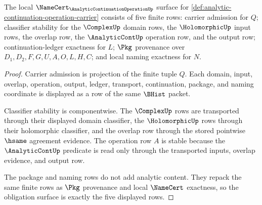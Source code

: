 \begin{theorem}
\label{thm:analytic-continuation-operation-namecert-obligations}
The local $\NameCert_{\AnalyticContinuationOperationUp}$ surface for \autoref{def:analytic-continuation-operation-carrier} consists of five finite rows: carrier admission for $Q$; classifier stability for the $\ComplexUp$ domain rows, the $\HolomorphicUp$ input rows, the overlap row, the $\AnalyticContUp$ operation row, and the output row; continuation-ledger exactness for $L$; $\Pkg$ provenance over $D_1,D_2,F,G,U,A,O,L,H,C$; and local naming exactness for $N$.
\end{theorem}
\begin{proof}
Carrier admission is projection of the finite tuple $Q$. Each domain, input, overlap, operation, output, ledger, transport, continuation, package, and naming coordinate is displayed as a row of the same $\BHist$ packet.

Classifier stability is componentwise. The $\ComplexUp$ rows are transported through their displayed domain classifier, the $\HolomorphicUp$ rows through their holomorphic classifier, and the overlap row through the stored pointwise $\hsame$ agreement evidence. The operation row $A$ is stable because the $\AnalyticContUp$ predicate is read only through the transported inputs, overlap evidence, and output row.

The package and naming rows do not add analytic content. They repack the same finite rows as $\Pkg$ provenance and local $\NameCert$ exactness, so the obligation surface is exactly the five displayed rows.
\end{proof}


